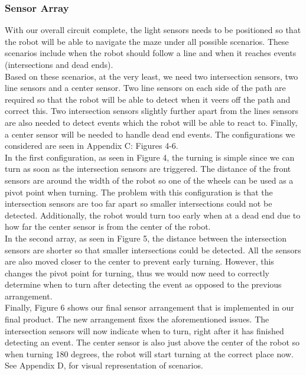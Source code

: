 \subsubsection*{Sensor Array}
With our overall circuit complete, the light sensors needs to be positioned so that the robot will be able to navigate the maze under all possible scenarios. These scenarios include when the robot should follow a line and when it reaches events (intersections and dead ends).
\\Based on these scenarios, at the very least, we need two intersection sensors, two line sensors and a center sensor. Two line sensors on each side of the path are required so that the robot will be able to detect when it veers off the path and correct this. Two intersection sensors slightly further apart from the lines sensors are also needed to detect events which the robot will be able to react to. Finally, a center sensor will be needed to handle dead end events. The configurations we considered are seen in Appendix C: Figures 4-6. 
\\In the first configuration, as seen in Figure 4, the turning is simple since we can turn as soon as the intersection sensors are triggered. The distance of the front sensors are around the width of the robot so one of the wheels can be used as a pivot point when turning. The problem with this configuration is that the intersection sensors are too far apart so smaller intersections could not be detected. Additionally, the robot would turn too early when at a dead end due to how far the center sensor is from the center of the robot.
\\In the second array, as seen in Figure 5, the distance between the intersection sensors are shorter so that smaller intersections could be detected. All the sensors are also moved closer to the center to prevent early turning. However, this changes the pivot point for turning, thus we would now need to correctly determine when to turn after detecting the event as opposed to the previous arrangement.
\\Finally, Figure 6 shows our final sensor arrangement that is implemented in our final product. The new arrangement fixes the aforementioned issues. The intersection sensors will now indicate when to turn, right after it has finished detecting an event. The center sensor is also just above the center of the robot so when turning 180 degrees, the robot will start turning at the correct place now. See Appendix D, for visual representation of scenarios.


